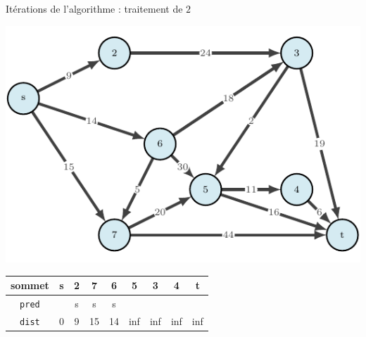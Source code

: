 \begin{frame}{Itérations de l'algorithme : traitement de $2$}
    \begin{center}
        \includegraphics[height=.6\textheight]{fig/ordinal-0.pdf}      
    \begin{tabular}{c|cccccccc}
        
        sommet & s       &2      &7      &6      &5      &3      &4      &t      \\
        \hline
        \texttt{pred} & &s      &s      &s      &       &       &       &       \\
        \texttt{dist} & 0       &9      &15     &14     &inf    &inf    &inf    &inf    \\
    \end{tabular}
\end{center}
\end{frame}

